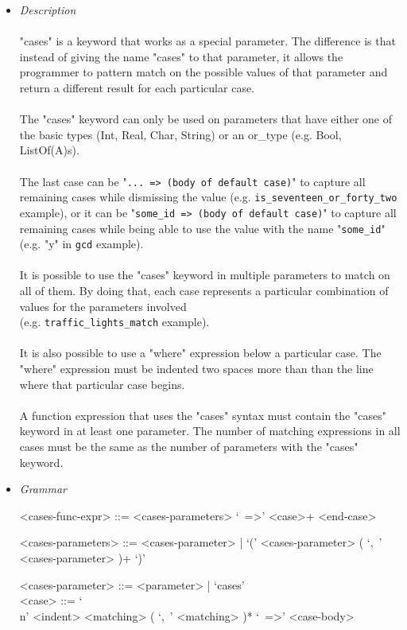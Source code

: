 \documentclass{article}
\begin{document}
\begin{itemize}
\item \textit{Description}\\\\
"cases" is a keyword that works as a special parameter. The difference is that
instead of giving the name "cases" to that parameter, it allows the programmer
to pattern match on the possible values of that parameter and return a
different result for each particular case. 
\\\\
The "cases" keyword can only be used on parameters that have either one of the 
basic types (Int, Real, Char, String) or an or\_type (e.g. Bool, ListOf(A)s).
\\\\
The last case can be "\texttt{... => (body of default case)}" to capture all
remaining cases while dismissing the value (e.g.
\texttt{is_seventeen_or_forty_two} example), or it can be
"\texttt{some_id => (body of default case)}" to capture all remaining
cases while being able to use the value with the name "\texttt{some_id}"
(e.g.  "y" in \texttt{gcd} example).
\\\\
It is possible to use the "cases" keyword in multiple parameters to match on all
of them. By doing that, each case represents a particular combination of values
for the parameters involved\\(e.g. \texttt{traffic_lights_match} example).
\\\\
It is also possible to use a "where" expression below a particular case. The
"where" expression must be indented two spaces more than than the line where
that particular case begins.
\\\\
A function expression that uses the "cases" syntax must contain the "cases"
keyword in at least one parameter. The number of matching expressions in 
all cases must be the same as the number of parameters with the "cases" keyword.

\item \textit{Grammar}
\begin{grammar}
<cases-func-expr> ::= <cases-parameters> `\ =>' <case>+ <end-case> 

<cases-parameters> ::=
<cases-parameter> | `(' <cases-parameter> ( `,\ ' <cases-parameter> )+ `)'

<cases-parameter> ::= <parameter> | `cases' \\

<case> ::=  `\\n' <indent> <matching> ( `,\ ' <matching> )* `\ =>' <case-body>


\end{grammar}
\end{itemize}
\end{document}
